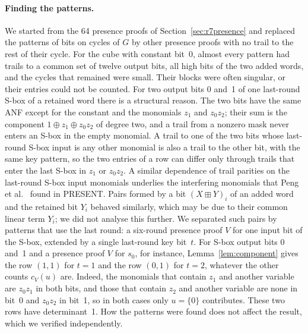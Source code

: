 \documentclass[11pt,a4paper]{article}
\theoremstyle{definition}
\theoremstyle{remark}
\newcommand{\add}{\boxplus}
\begin{document}
\paragraph{Finding the patterns.} We started from the 64 presence proofs of Section~\ref{sec:r7presence} and replaced the patterns of bits on cycles of $G$ by other presence proofs with no trail to the rest of their cycle. For the cube with constant bit~0, almost every pattern had trails to a common set of twelve output bits, all high bits of the two added words, and the cycles that remained were small. Their blocks were often singular, or their entries could not be counted. For two output bits 0 and~1 of one last-round S-box of a retained word there is a structural reason. The two bits have the same ANF except for the constant and the monomials $z_1$ and $z_0z_2$; their sum is the component $1\oplus z_1\oplus z_0z_2$ of degree two, and a trail from a nonzero mask never enters an S-box in the empty monomial. A trail to one of the two bits whose last-round S-box input is any other monomial is also a trail to the other bit, with the same key pattern, so the two entries of a row can differ only through trails that enter the last S-box in $z_1$ or $z_0z_2$. A similar dependence of trail parities on the last-round S-box input monomials underlies the interfering monomials that Peng et al.~\cite{peng2026} found in PRESENT. Pairs formed by a bit $(X\add Y)_i$ of an added word and the retained bit $Y_i$ behaved similarly, which may be due to their common linear term $Y_i$; we did not analyse this further. We separated such pairs by patterns that use the last round: a six-round presence proof $V$ for one input bit of the S-box, extended by a single last-round key bit~$t$. For S-box output bits 0 and~1 and a presence proof $V$ for $s_0$, for instance, Lemma~\ref{lem:component} gives the row $(1,1)$ for $t=1$ and the row $(0,1)$ for $t=2$, whatever the other counts $c_V(u)$ are. Indeed, the monomials that contain $z_1$ and another variable are $z_0z_1$ in both bits, and those that contain $z_2$ and another variable are none in bit~0 and $z_0z_2$ in bit~1, so in both cases only $u=\{0\}$ contributes. These two rows have determinant~1. How the patterns were found does not affect the result, which we verified independently.
\end{document}
